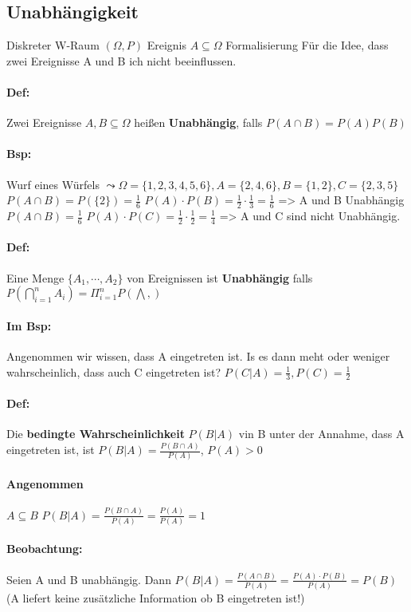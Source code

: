 \documentclass{article}
\begin{document}
\subsection*{Unabhängigkeit}
Diskreter W-Raum \((\Omega, P)\) Ereignis \(A \subseteq \Omega\) Formalisierung Für die Idee, dass zwei Ereignisse A und B ich nicht beeinflussen. 
\paragraph*{Def:} Zwei Ereignisse \(A,B \subseteq \Omega\) heißen \textbf{Unabhängig}, falls \(P(A \cap B) = P(A) P(B)\)
\paragraph*{Bsp:} Wurf eines Würfels \(\leadsto \Omega = \{1,2,3,4,5,6\}, A =\{2,4,6\}, B = \{1,2\}, C=\{2,3,5\}\) \(P(A \cap B) = P(\{2\}) = \frac{1}{6}\) \(P(A) \cdot P(B) = \frac{1}{2} \cdot \frac{1}{3} = \frac{1}{6}\) => A und B Unabhängig \(P(A \cap B ) = \frac{1}{6}\) \(P(A) \cdot P(C) = \frac{1}{2} \cdot \frac{1}{2} = \frac{1}{4}\) => A und C sind nicht Unabhängig.

\paragraph*{Def:} Eine Menge \(\{A_1, \cdots, A_2\}\) von Ereignissen ist \textbf{Unabhängig} falls \(P(\bigcap^n_{i=1} A_i) = \Pi^n_{i = 1}P(\bigwedge,)\)
\paragraph*{Im Bsp:} Angenommen wir wissen, dass A eingetreten ist. Is es dann meht oder weniger wahrscheinlich, dass auch C eingetreten ist?
\(P(C \vert A) = \frac{1}{3}, P(C) = \frac{1}{2}\)
\paragraph*{Def:} Die \textbf{bedingte Wahrscheinlichkeit} \(P(B \vert A)\) vin B unter der Annahme, dass A eingetreten ist, ist \(P(B \vert A) = \frac{P(B \cap A)}{P(A)}\), \(P(A) > 0\)

\paragraph*{Angenommen} \(A \subseteq B\) \(P(B \vert A) = \frac{P(B \cap A)}{P(A)} = \frac{P(A)}{P(A)} = 1\)

\paragraph*{Beobachtung: } Seien A und B unabhängig. Dann \(P(B \vert A) = \frac{P(A \cap B)}{P(A)} = \frac{P(A) \cdot P(B)}{P(A)} = P(B)\) (A liefert keine zusätzliche Information ob B eingetreten ist!)
\end{document}

